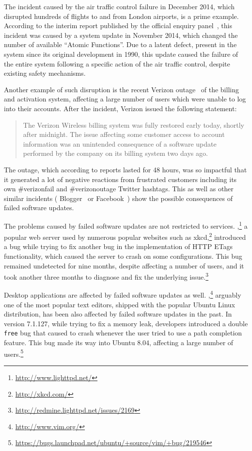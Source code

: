 The incident caused by the air traffic control failure in December 2014, which
disrupted hundreds of flights to and from London airports, is a prime example.
According to the interim report published by the official enquiry
panel~\cite{natsfailure}, this incident was caused by a system update in
November 2014, which changed the number of available ``Atomic Functions''. Due
to a latent defect, present in the system since its original development in
1990, this update caused the failure of the entire system following a specific
action of the air traffic control, despite existing safety mechanisms.

Another example of such disruption is the recent Verizon
outage~\cite{verizon-outage2014} of the billing and activation system,
affecting a large number of users which were unable to log into their accounts.
After the incident, Verizon issued the following statement:
\begin{quotation}
The Verizon Wireless billing system was fully restored early today, shortly
after midnight. The issue affecting some customer access to account information
was an unintended consequence of a software update performed by the company on
its billing system two days ago.
\end{quotation}
The outage, which according to reports lasted for 48 hours, was so impactful
that it generated a lot of negative reactions from frustrated customers
including its own \textsf{\#verizonfail} and \textsf{\#verizonoutage} Twitter
hashtags.  This as well as other similar incidents (\eg
Blogger~\cite{blogger-incident2011} or Facebook~\cite{facebook-incident2010})
show the possible consequences of failed software updates.

The problems caused by failed software updates are not restricted to services.
\lighttpd,\footnote{\url{http://www.lighttpd.net/}} a popular web server used
by numerous popular websites such as xkcd,\footnote{\url{http://xkcd.com/}}
introduced a bug while trying to fix another bug in the implementation of HTTP
ETags functionality, which caused the server to crash on some configurations.
This bug remained undetected for nine months, despite affecting a number of
users, and it took another three months to diagnose and fix the underlying
issue.\footnote{\url{http://redmine.lighttpd.net/issues/2169}}

Desktop applications are affected by failed software updates as well.
\vim,\footnote{\url{http://www.vim.org/}} arguably one of the most popular text
editors, shipped with the popular Ubuntu Linux distribution, has been also
affected by failed software updates in the past. In version 7.1.127, while
trying to fix a memory leak, \vim developers introduced a double \lstinline`free`
bug that caused \vim to crash whenever the user tried to use a path completion
feature.  This bug made its way into Ubuntu 8.04, affecting a large number of
users.\footnote{\url{https://bugs.launchpad.net/ubuntu/+source/vim/+bug/219546}}




